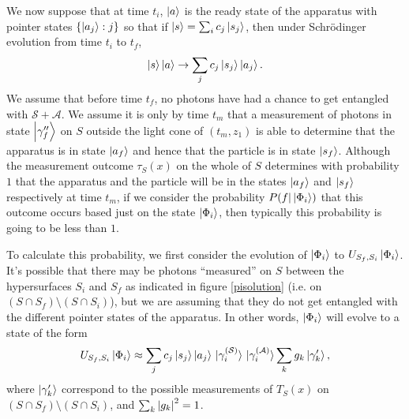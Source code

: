  We now suppose that at time $t_i$, $\ket{a}$ is the ready state of the apparatus with pointer states $\{\ket{a_j}:j\}$ so that if $\ket{s}=\sum_i c_j\ket{s_j}$, then under Schr\"{o}dinger evolution from time $t_i$ to $t_f$,
 $$\ket{s}\ket{a}\rightarrow\sum_j c_j\ket{s_j}\ket{a_j}.$$
 We assume that before time $t_f$, no photons have had a chance to get entangled with $\mathcal{S}+\mathcal{A}$. We assume it is only by time $t_m$ that a measurement of photons in state $\ket{\gamma_f^{\prime\prime}}$ on $S$ outside the light cone of $(t_m,z_1)$ is able to determine that the apparatus is in state $\ket{a_f}$ and hence that the particle is in state $\ket{s_f}$. Although the measurement outcome $\tau_S(x)$ on the whole of $S$ determines with probability $1$ that the apparatus and the particle will be in the states $\ket{a_f}$ and $\ket{s_f}$ respectively at time $t_m$, if we consider the probability $P(f|\ket{\Phi_i})$ that this outcome occurs based just on the state $\ket{\Phi_i}$, then typically this probability is going to be less than $1$.
 
 To calculate this probability, we first consider the evolution of $\ket{\Phi_i}$ to $ U_{S_f,S_i}\ket{\Phi_{i}}$. It's possible that there may be photons ``measured'' on $S$ between the hypersurfaces $S_i$ and $S_f$ as indicated in figure \ref{pisolution} (i.e. on $(S\cap S_f)\setminus(S\cap S_i)$), but we are assuming that they do not get entangled with the different pointer states of the apparatus. In other words, $\ket{\Phi_i}$ will evolve to a state of the form 
\begin{equation}\label{USfievolve1}
	U_{S_f,S_i}\ket{\Phi_{i}}\approx \sum_j c_j\ket{s_j}\ket{a_j}\ket*{\gamma_i^{(\mathcal{S})}}\ket*{\gamma_i^{(\mathcal{A})}}\sum_kg_k\ket{\gamma'_k},
\end{equation}
where $\ket{\gamma_k'}$ correspond to the possible measurements of $T_S(x)$  on $(S\cap S_f)\setminus(S\cap S_i)$, and $\sum_k\abs{g_k}^2=1$.

